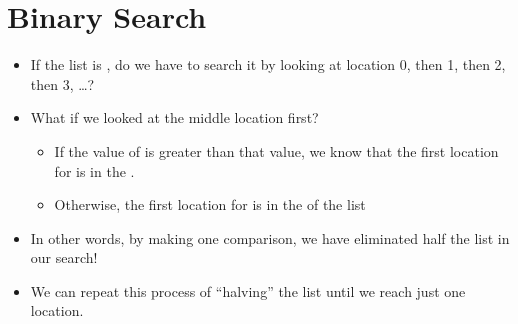 \documentclass[letterpaper,10pt,english]{sphinxmanual}
\begin{document}
\section{Binary Search}
\label{\detokenize{lecture_notes/lec20_searching:binary-search}}\begin{itemize}
\item {} 
If the list is , do we have to search it by looking at
location 0, then 1, then 2, then 3, …?

\item {} 
What if we looked at the middle location first?
\begin{itemize}
\item {} 
If the value of  is greater than that value, we know that the
first location for  is in the .

\item {} 
Otherwise, the first location for  is in the 
of the list

\end{itemize}

\item {} 
In other words, by making one comparison, we have eliminated half the
list in our search!

\item {} 
We can repeat this process of “halving” the list until we reach just
one location.

\end{itemize}
\end{document}
